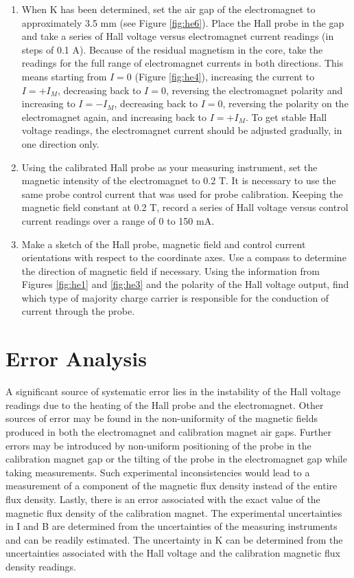 \begin{enumerate}
\item When K has been determined, set the air gap of the electromagnet to approximately 3.5 mm (see Figure \ref{fig:he6}). Place the Hall probe in the gap and take a series of Hall voltage versus electromagnet current readings (in steps of 0.1 A). Because of the residual magnetism in the core, take the readings for the full range of electromagnet currents in both directions. This means starting from $I=0$ (Figure \ref{fig:he4}), increasing the current to $I=+I_M$, decreasing back to $I=0$, reversing the electromagnet polarity and increasing to $I=-I_M$, decreasing back to $I=0$, reversing the polarity on the electromagnet again, and increasing back to $I=+I_M$. To get stable Hall voltage readings, the electromagnet current should be adjusted gradually, in one direction only.

\item Using the calibrated Hall probe as your measuring instrument, set the magnetic intensity of the electromagnet to 0.2 T. It is necessary to use the same probe control current that was used for probe calibration. Keeping the magnetic field constant at 0.2 T, record a series of Hall voltage versus control current readings over a range of 0 to 150 mA.

\item Make a sketch of the Hall probe, magnetic field and control current orientations with respect to the coordinate axes. Use a compass to determine the direction of magnetic field if necessary. Using the information from Figures \ref{fig:he1} and \ref{fig:he3} and the polarity of the Hall voltage output, find which type of majority charge carrier is responsible for the conduction of current through the probe.

\end{enumerate}

\section{Error Analysis}

A significant source of systematic error lies in the instability of the Hall voltage readings due to the heating of the Hall probe and the electromagnet. Other sources of error may be found in the non-uniformity of the magnetic fields produced in both the electromagnet and calibration magnet air gaps. Further errors may be introduced by non-uniform positioning of the probe in the calibration magnet gap or the tilting of the probe in the electromagnet gap while taking measurements. Such experimental inconsistencies would lead to a measurement of a component of the magnetic flux density instead of the entire flux density. Lastly, there is an error associated with the exact value of the magnetic flux density of the calibration magnet. The experimental uncertainties in I and B are determined from the uncertainties of the measuring instruments and can be readily estimated. The uncertainty in K can be determined from the uncertainties associated with the Hall voltage and the calibration magnetic flux density readings. 


